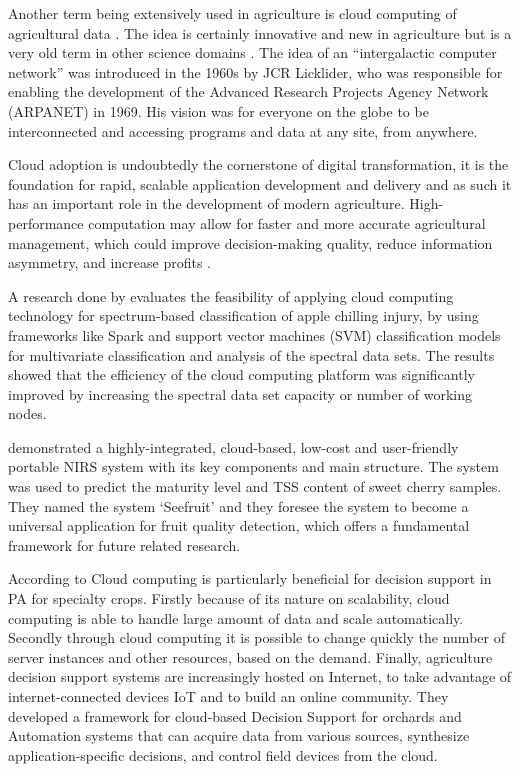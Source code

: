 \documentclass[review]{elsarticle}
\begin{document}
    Another term being extensively used in agriculture is cloud computing of agricultural data \cite{Woodard_2016, Wolfert_2017, Kaloxylos_2012}. The idea is certainly innovative and new in agriculture but is a very old term in other science domains \cite{Kamilaris_2017}. The idea of an “intergalactic computer network” was introduced in the 1960s by JCR Licklider, who was responsible for enabling the development of the Advanced Research Projects Agency Network (ARPANET) in 1969. His vision was for everyone on the globe to be interconnected and accessing programs and data at any site, from anywhere.

    Cloud adoption is undoubtedly the cornerstone of digital transformation, it is the foundation for rapid, scalable application development and delivery and as such it has an important role in the development of modern agriculture. High-performance computation may allow for faster and more accurate agricultural management, which could improve decision-making quality, reduce information asymmetry, and increase profits \cite{Jayaraman_2016}.

    A research done by \cite{Xia_2018} evaluates the feasibility of applying cloud computing technology for spectrum-based classification of apple chilling injury, by using frameworks like Spark and support vector machines (SVM) classification models for multivariate classification and analysis of the spectral data sets. The results showed that the efficiency of the cloud computing platform was significantly improved by increasing the spectral data set capacity or number of working nodes.

    \cite{Wang_2018} demonstrated a highly-integrated, cloud-based, low-cost and user-friendly portable NIRS system with its key components and main structure. The system was used to predict the maturity level and TSS content of sweet cherry samples. They named the system ‘Seefruit’ and they foresee the system to become a universal application for fruit quality detection, which offers a fundamental framework for future related research.

    According to \cite{Tan_2016} Cloud computing is particularly beneficial for decision support in PA for specialty crops. Firstly because of its nature on scalability, cloud computing is able to handle large amount of data and scale automatically. Secondly through  cloud computing it is possible to change quickly the number of server instances and other resources, based on the demand. Finally, agriculture decision support systems are increasingly hosted on Internet, to take advantage of internet-connected devices IoT and to build an online community. They developed a framework for cloud-based Decision Support for orchards and Automation systems that can acquire data from various sources, synthesize application-specific decisions, and control field devices from the cloud.
\end{document}
